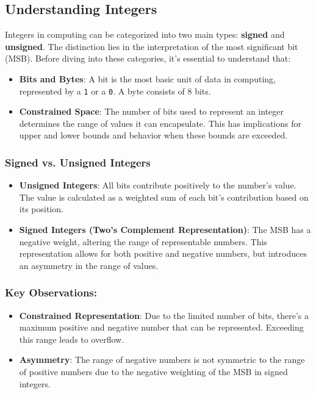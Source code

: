 \documentclass{article}
\begin{document}
\subsection{Understanding Integers}

Integers in computing can be categorized into two main types: \textbf{signed} and \textbf{unsigned}. The distinction lies in the interpretation of the most significant bit (MSB). Before diving into these categories, it's essential to understand that:

\begin{itemize}
    \item \textbf{Bits and Bytes}: A bit is the most basic unit of data in computing, represented by a \texttt{1} or a \texttt{0}. A byte consists of 8 bits.
    \item \textbf{Constrained Space}: The number of bits used to represent an integer determines the range of values it can encapsulate. This has implications for upper and lower bounds and behavior when these bounds are exceeded.
\end{itemize}

\subsubsection{Signed vs. Unsigned Integers}

\begin{itemize}
    \item \textbf{Unsigned Integers}: All bits contribute positively to the number's value. The value is calculated as a weighted sum of each bit's contribution based on its position.
    
    \item \textbf{Signed Integers (Two's Complement Representation)}: The MSB has a negative weight, altering the range of representable numbers. This representation allows for both positive and negative numbers, but introduces an asymmetry in the range of values.
\end{itemize}

\subsubsection{Key Observations:}

\begin{itemize}
    \item \textbf{Constrained Representation}: Due to the limited number of bits, there's a maximum positive and negative number that can be represented. Exceeding this range leads to overflow.
    
    \item \textbf{Asymmetry}: The range of negative numbers is not symmetric to the range of positive numbers due to the negative weighting of the MSB in signed integers.
\end{itemize}
\end{document}
